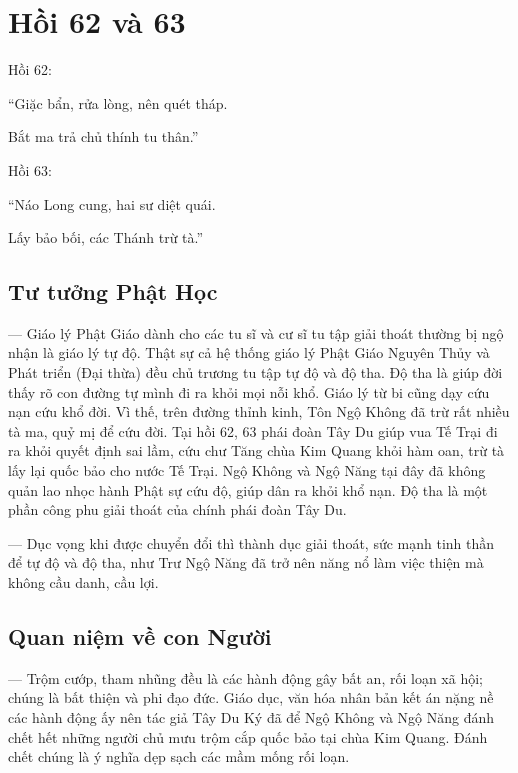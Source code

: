\chapter{Hồi 62 và 63} %
\label{cha:hoi_62_63}

Hồi 62:

\begin{itshape}
``Giặc bẩn, rửa lòng, nên quét tháp.

Bắt ma trả chủ thính tu thân.''
\end{itshape}

Hồi 63:

\begin{itshape}
``Náo Long cung, hai sư diệt quái.

Lấy bảo bối, các Thánh trừ tà.''
\end{itshape}

\section{Tư tưởng Phật Học} %
\label{sec:62_63_phat_hoc}

— Giáo lý Phật Giáo dành cho các tu sĩ và cư sĩ tu tập giải thoát thường bị ngộ nhận là giáo lý tự độ. Thật sự cả hệ thống giáo lý Phật Giáo Nguyên Thủy và Phát triển (Đại thừa) đều chủ trương tu tập tự độ và độ tha. Độ tha là giúp đời thấy rõ con đường tự mình đi ra khỏi mọi nỗi khổ. Giáo lý từ bi cũng dạy cứu nạn cứu khổ đời. Vì thế, trên đường thỉnh kinh, Tôn Ngộ Không đã trừ rất nhiều tà ma, quỷ mị để cứu đời. Tại hồi 62, 63 phái đoàn Tây Du giúp vua Tế Trại đi ra khỏi quyết định sai lầm, cứu chư Tăng chùa Kim Quang khỏi hàm oan, trừ tà lấy lại quốc bảo cho nước Tế Trại. Ngộ Không và Ngộ Năng tại đây đã không quản lao nhọc hành Phật sự cứu độ, giúp dân ra khỏi khổ nạn. Độ tha là một phần công phu giải thoát của chính phái đoàn Tây Du.

— Dục vọng khi được chuyển đổi thì thành dục giải thoát, sức mạnh tinh thần để tự độ và độ tha, như Trư Ngộ Năng đã trở nên năng nổ làm việc thiện mà không cầu danh, cầu lợi.

\section{Quan niệm về con Người} %
\label{sec:62_63_con_nguoi}

— Trộm cướp, tham nhũng đều là các hành động gây bất an, rối loạn xã hội; chúng là bất thiện và phi đạo đức. Giáo dục, văn hóa nhân bản kết án nặng nề các hành động ấy nên tác giả Tây Du Ký đã để Ngộ Không và Ngộ Năng đánh chết hết những người chủ mưu trộm cắp quốc bảo tại chùa Kim Quang. Đánh chết chúng là ý nghĩa dẹp sạch các mầm mống rối loạn.

